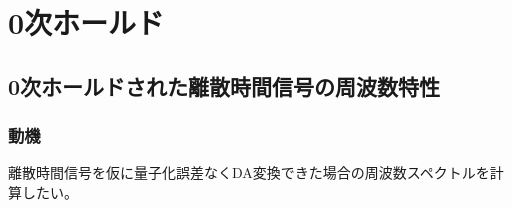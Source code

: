 \chapter{0次ホールド}
    \providecommand{\FT}[1]{\mathcal{F}\parens*{#1}}
    \providecommand{\Ts}{T_\text{s}}
    \section{0次ホールドされた離散時間信号の周波数特性}
        \label{0次ホールドされた離散時間信号の周波数特性}
        \newcommand{\xd}{x_\text{d}}
        \newcommand{\Xd}{X_\text{d}}
        \subsection{動機}
            離散時間信号を仮に量子化誤差なくDA変換できた場合の周波数スペクトルを計算したい。
